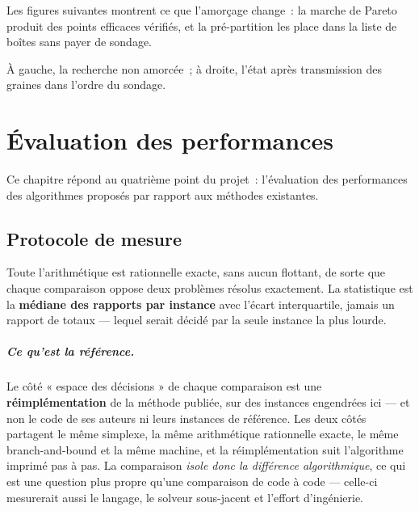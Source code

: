 \documentclass[12pt,a4paper]{report}
\newcommand{\fig}[1]{}
\theoremstyle{plain}
\theoremstyle{definition}
\begin{document}
Les figures suivantes montrent ce que l'amorçage change~: la marche de Pareto
produit des points efficaces vérifiés, et la pré-partition les place dans la
liste de boîtes sans payer de sondage.

\begin{center}
\fig{ha-walk}
\end{center}

\noindent
À gauche, la recherche non amorcée~; à droite, l'état après transmission des
graines dans l'ordre du sondage.

\begin{center}
\fig{ha-left}
\end{center}

\chapter{Évaluation des performances}
\label{ch:resultats}

Ce chapitre répond au quatrième point du projet~: l'évaluation des performances
des algorithmes proposés par rapport aux méthodes existantes.

\section{Protocole de mesure}

Toute l'arithmétique est rationnelle exacte, sans aucun flottant, de sorte que
chaque comparaison oppose deux problèmes résolus exactement.  La statistique
est la \textbf{médiane des rapports par instance} avec l'écart interquartile,
jamais un rapport de totaux --- lequel serait décidé par la seule instance la
plus lourde.

\paragraph{Ce qu'est la référence.}
Le côté « espace des décisions » de chaque comparaison est une
\textbf{réimplémentation} de la méthode publiée, sur des instances engendrées
ici --- et non le code de ses auteurs ni leurs instances de référence.  Les
deux côtés partagent le même simplexe, la même arithmétique rationnelle exacte,
le même branch-and-bound et la même machine, et la réimplémentation suit
l'algorithme imprimé pas à pas.  La comparaison \emph{isole donc la différence
algorithmique}, ce qui est une question plus propre qu'une comparaison de code
à code --- celle-ci mesurerait aussi le langage, le solveur sous-jacent et
l'effort d'ingénierie.
\end{document}
